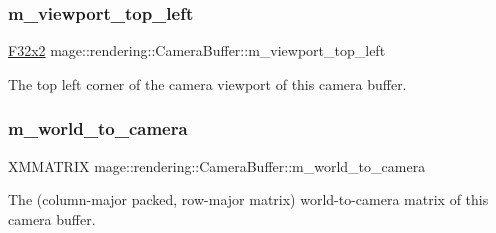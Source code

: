 \subsubsection{\texorpdfstring{m\+\_\+viewport\+\_\+top\+\_\+left}{m\_viewport\_top\_left}}
{\footnotesize\ttfamily \mbox{\hyperlink{namespacemage_a9dc0d34d6ecc87e4cfa4a826102117bc}{F32x2}} mage\+::rendering\+::\+Camera\+Buffer\+::m\+\_\+viewport\+\_\+top\+\_\+left}

The top left corner of the camera viewport of this camera buffer. \mbox{\label{structmage_1_1rendering_1_1_camera_buffer_af1ceff883dcc383ce10f2165a5a9a061}} 
\subsubsection{\texorpdfstring{m\+\_\+world\+\_\+to\+\_\+camera}{m\_world\_to\_camera}}
{\footnotesize\ttfamily X\+M\+M\+A\+T\+R\+IX mage\+::rendering\+::\+Camera\+Buffer\+::m\+\_\+world\+\_\+to\+\_\+camera}

The (column-\/major packed, row-\/major matrix) world-\/to-\/camera matrix of this camera buffer. 